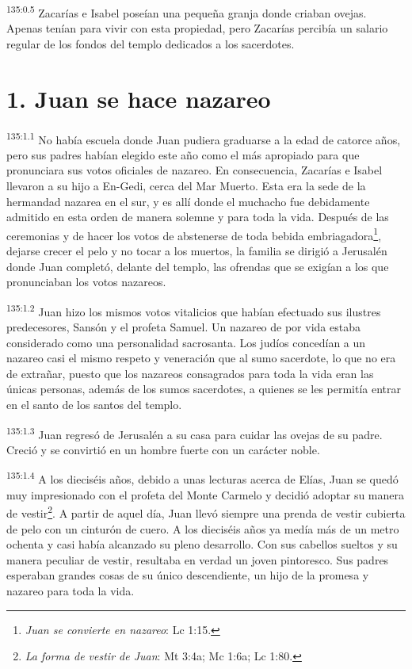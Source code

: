 \par
\textsuperscript{135:0.5} Zacarías e Isabel poseían una pequeña granja donde criaban ovejas. Apenas tenían para vivir con esta propiedad, pero Zacarías percibía un salario regular de los fondos del templo dedicados a los sacerdotes.

\section*{1. Juan se hace nazareo}
\par
\textsuperscript{135:1.1} No había escuela donde Juan pudiera graduarse a la edad de catorce años, pero sus padres habían elegido este año como el más apropiado para que pronunciara sus votos oficiales de nazareo. En consecuencia, Zacarías e Isabel llevaron a su hijo a En-Gedi, cerca del Mar Muerto. Esta era la sede de la hermandad nazarea en el sur, y es allí donde el muchacho fue debidamente admitido en esta orden de manera solemne y para toda la vida. Después de las ceremonias y de hacer los votos de abstenerse de toda bebida embriagadora\footnote{\textit{Juan se convierte en nazareo}: Lc 1:15.}, dejarse crecer el pelo y no tocar a los muertos, la familia se dirigió a Jerusalén donde Juan completó, delante del templo, las ofrendas que se exigían a los que pronunciaban los votos nazareos.

\par
\textsuperscript{135:1.2} Juan hizo los mismos votos vitalicios que habían efectuado sus ilustres predecesores, Sansón y el profeta Samuel. Un nazareo de por vida estaba considerado como una personalidad sacrosanta. Los judíos concedían a un nazareo casi el mismo respeto y veneración que al sumo sacerdote, lo que no era de extrañar, puesto que los nazareos consagrados para toda la vida eran las únicas personas, además de los sumos sacerdotes, a quienes se les permitía entrar en el santo de los santos del templo.

\par
\textsuperscript{135:1.3} Juan regresó de Jerusalén a su casa para cuidar las ovejas de su padre. Creció y se convirtió en un hombre fuerte con un carácter noble.

\par
\textsuperscript{135:1.4} A los dieciséis años, debido a unas lecturas acerca de Elías, Juan se quedó muy impresionado con el profeta del Monte Carmelo y decidió adoptar su manera de vestir\footnote{\textit{La forma de vestir de Juan}: Mt 3:4a; Mc 1:6a; Lc 1:80.}. A partir de aquel día, Juan llevó siempre una prenda de vestir cubierta de pelo con un cinturón de cuero. A los dieciséis años ya medía más de un metro ochenta y casi había alcanzado su pleno desarrollo. Con sus cabellos sueltos y su manera peculiar de vestir, resultaba en verdad un joven pintoresco. Sus padres esperaban grandes cosas de su único descendiente, un hijo de la promesa y nazareo para toda la vida.

